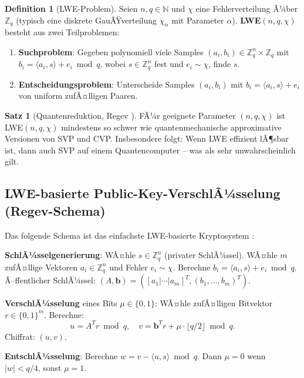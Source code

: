 ﻿\documentclass[a4paper,12pt]{scrreprt}
\theoremstyle{definition}
\newtheorem{definition}{Definition}[section]
\newtheorem{satz}{Satz}[section]
\begin{document}
\begin{definition}[LWE-Problem]
Seien $n, q \in \mathbb{N}$ und $\chi$ eine Fehlerverteilung Ã¼ber $\mathbb{Z}_q$ (typisch eine diskrete GauÃŸverteilung $\chi_\alpha$ mit Parameter $\alpha$). \textbf{LWE}$(n, q, \chi)$ besteht aus zwei Teilproblemen:
\begin{enumerate}
    \item \textbf{Suchproblem}: Gegeben polynomiell viele Samples $(a_i, b_i) \in \mathbb{Z}_q^n \times \mathbb{Z}_q$ mit $b_i = \langle a_i, s \rangle + e_i \bmod q$, wobei $s \in \mathbb{Z}_q^n$ fest und $e_i \sim \chi$, finde $s$.
    \item \textbf{Entscheidungsproblem}: Unterscheide Samples $(a_i, b_i)$ mit $b_i = \langle a_i, s \rangle + e_i$ von uniform zufÃ¤lligen Paaren.
\end{enumerate}
\end{definition}

\begin{satz}[Quantenreduktion, Regev \cite{Reg05}]
FÃ¼r geeignete Parameter $(n, q, \chi)$ ist LWE$(n,q,\chi)$ mindestens so schwer wie quantenmechanische approximative Versionen von SVP und CVP. Insbesondere folgt: Wenn LWE effizient lÃ¶sbar ist, dann auch SVP auf einem Quantencomputer -- was als sehr unwahrscheinlich gilt.
\end{satz}

\subsection{LWE-basierte Public-Key-VerschlÃ¼sselung (Regev-Schema)}

Das folgende Schema ist das einfachste LWE-basierte Kryptosystem \cite{Reg05}:

\textbf{SchlÃ¼sselgenerierung}: WÃ¤hle $s \in \mathbb{Z}_q^n$ (privater SchlÃ¼ssel). WÃ¤hle $m$ zufÃ¤llige Vektoren $a_i \in \mathbb{Z}_q^n$ und Fehler $e_i \sim \chi$. Berechne $b_i = \langle a_i, s \rangle + e_i \bmod q$. Ã–ffentlicher SchlÃ¼ssel: $(A, \mathbf{b}) = ([a_1|\cdots|a_m]^T, (b_1,\ldots,b_m)^T)$.

\textbf{VerschlÃ¼sselung} eines Bits $\mu \in \{0,1\}$: WÃ¤hle zufÃ¤lligen Bitvektor $r \in \{0,1\}^m$. Berechne:
\[
u = A^T r \bmod q, \quad v = \mathbf{b}^T r + \mu \cdot \lfloor q/2 \rfloor \bmod q.
\]
Chiffrat: $(u, v)$.

\textbf{EntschlÃ¼sselung}: Berechne $w = v - \langle u, s \rangle \bmod q$. Dann $\mu = 0$ wenn $|w| < q/4$, sonst $\mu = 1$.
\end{document}
